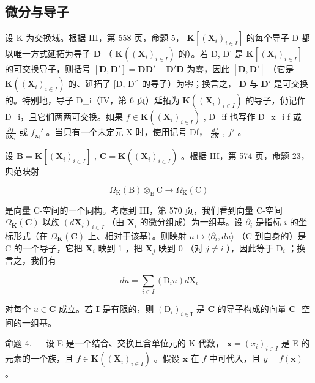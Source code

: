 \subsection{微分与导子}

设 K 为交换域。根据 III，第 558 页，命题 5， \(\mathbf{K}[(\mathbf{X}_i)_{i\in I}]\) 的每个导子 D 都以唯一方式延拓为导子 \(\bar{\mathbf{D}}\) （ \(\mathbf{K}((\mathbf{X}_i)_{i\in I})\) 的）。若 D, D' 是 \(\mathbf{K}[(\mathbf{X}_i)_{i\in I}]\) 的可交换导子，则括号 \([\mathbf{D},\mathbf{D}'] = \mathbf{DD}' - \mathbf{D}'\mathbf{D}\) 为零，因此 \([\bar{\mathbf{D}},\bar{\mathbf{D}}']\) （它是 \(\mathbf{K}((\mathbf{X}_i)_{i\in I})\) 的、延拓了 {[}D, D'{]} 的导子）为零；换言之， \(\bar{\mathbf{D}}\) 与 \(\bar{\mathbf{D}}'\) 是可交换的。特别地，导子 D\_i（IV，第 6 页）延拓为 \(\mathbf{K}((\mathbf{X}_i)_{i\in I})\) 的导子，仍记作 D\_i，且它们两两可交换。如果 \(f\in \mathbf{K}((\mathbf{X}_i)_{i\in I})\) , D\_if 也写作 D\_x\_i f 或 \(\frac{\partial f}{\partial\mathbf{X}_i}\) 或 \(f_{\mathbf{x}_i}'\) 。当只有一个未定元 X 时，使用记号 Df， \(\frac{df}{d\mathbf{X}}\) , \(f'\) 。

设 \(\mathbf{B} = \mathbf{K}[(\mathbf{X}_i)_{i \in I}]\) , \(\mathbf{C} = \mathbf{K}((\mathbf{X}_i)_{i \in I})\) 。根据 III，第 574 页，命题 23，典范映射

\[
\Omega_ {\mathrm{K}} (\mathrm{B}) \otimes_ {\mathrm{B}} \mathrm{C} \rightarrow \Omega_ {\mathrm{K}} (\mathrm{C})
\]

是向量 C-空间的一个同构。考虑到 III，第 570 页，我们看到向量 C-空间 \(\Omega_{\mathbf{K}}(\mathbf{C})\) 以族 \((d\mathbf{X}_i)_{i\in I}\) （由 \(\mathbf{X}_i\) 的微分组成）为一组基。设 \(\partial_i\) 是指标 \(i\) 的坐标形式（在 \(\Omega_{\mathbf{K}}(\mathbf{C})\) 上、相对于该基）。则映射 \(u\mapsto \langle \partial_i,du\rangle\) （C 到自身的）是 C 的一个导子，它把 \(\mathbf{X}_i\) 映到 1 ，把 \(\mathbf{X}_j\) 映到 0 （对 \(j\neq i\) ），因此等于 \(\mathrm{D}_i\) ；换言之，我们有

\[
d u = \sum_ {i \in I} \left(\mathrm{D} _ {i} u\right) d \mathrm{X} _ {i}\tag{1}
\]

对每个 \(u \in \mathbf{C}\) 成立。若 \(\mathbf{I}\) 是有限的，则 \((\mathrm{D}_i)_{i \in \mathbf{I}}\) 是 \(\mathbf{C}\) 的导子构成的向量 \(\mathbf{C}\) -空间的一组基。

命题 4. --- 设 E 是一个结合、交换且含单位元的 K-代数， \(\mathbf{x} = (x_i)_{i \in I}\) 是 E 的元素的一个族，且 \(f \in \mathbf{K}((\mathbf{X}_i)_{i \in I})\) 。假设 \(\mathbf{x}\) 在 \(f\) 中可代入，且 \(y = f(\mathbf{x})\) 。

